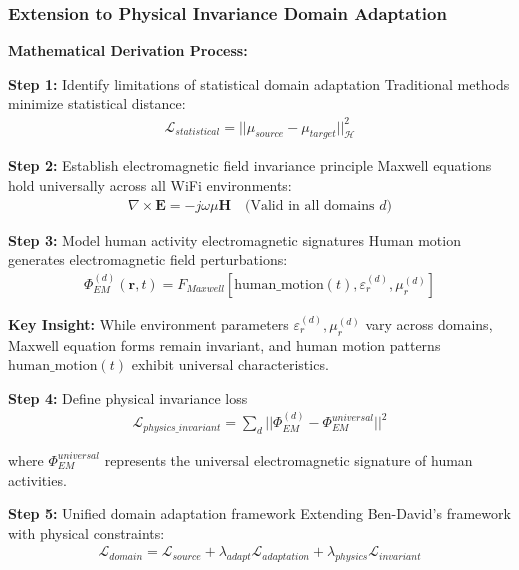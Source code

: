 \documentclass[12pt,a4paper]{article}
\begin{document}
\subsubsection{Extension to Physical Invariance Domain Adaptation}

\textbf{Mathematical Derivation Process:}

\textbf{Step 1:} Identify limitations of statistical domain adaptation
Traditional methods minimize statistical distance:
\begin{align}
\mathcal{L}_{statistical} = ||\mu_{source} - \mu_{target}||^2_{\mathcal{H}} \label{eq:statistical_adaptation}
\end{align}

\textbf{Step 2:} Establish electromagnetic field invariance principle
Maxwell equations hold universally across all WiFi environments:
\begin{align}
\nabla \times \mathbf{E} = -j\omega\mu\mathbf{H} \quad \text{(Valid in all domains } d \text{)} \label{eq:universal_maxwell}
\end{align}

\textbf{Step 3:} Model human activity electromagnetic signatures
Human motion generates electromagnetic field perturbations:
\begin{align}
\Phi_{EM}^{(d)}(\mathbf{r},t) = F_{Maxwell}[\text{human\_motion}(t), \varepsilon_r^{(d)}, \mu_r^{(d)}] \label{eq:em_signature}
\end{align}

\textbf{Key Insight:} While environment parameters $\varepsilon_r^{(d)}, \mu_r^{(d)}$ vary across domains, Maxwell equation forms remain invariant, and human motion patterns $\text{human\_motion}(t)$ exhibit universal characteristics.

\textbf{Step 4:} Define physical invariance loss
\begin{align}
\mathcal{L}_{physics\_invariant} = \sum_d ||\Phi_{EM}^{(d)} - \Phi_{EM}^{universal}||^2 \label{eq:physics_invariant_loss}
\end{align}

where $\Phi_{EM}^{universal}$ represents the universal electromagnetic signature of human activities.

\textbf{Step 5:} Unified domain adaptation framework
Extending Ben-David's framework with physical constraints:
\begin{align}
\mathcal{L}_{domain} = \mathcal{L}_{source} + \lambda_{adapt} \mathcal{L}_{adaptation} + \lambda_{physics} \mathcal{L}_{invariant} \label{eq:unified_domain_adaptation}
\end{align}
\end{document}
